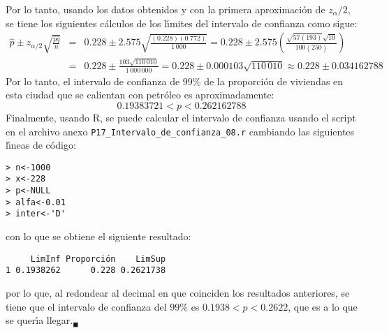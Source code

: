 \begin{solucion}
 Por lo tanto, usando los datos obtenidos y con la primera aproximaci\'on de $z_{\alpha}/2$, se tiene los siguientes c\'alculos de los l\'{\i}mites del intervalo de confianza como sigue:
 \begin{eqnarray*}
  \hat{p} \pm z_{\alpha/2} \sqrt{\frac{\hat{p}\hat{q}}{n}} & = & 0.228 \pm 2.575\sqrt{\frac{(0.228)(0.772)}{1\,000}} = 0.228 \pm 2.575\left( \frac{\sqrt{57(193)}\sqrt{10}}{100(250)} \right) \\
  & = & 0.228 \pm \frac{103\sqrt{110\,010}}{1\,000\,000} = 0.228 \pm 0.000103\sqrt{110\,010} \approx 0.228 \pm 0.034162788
 \end{eqnarray*}
 Por lo tanto, el intervalo de confianza de $99\%$ de la proporci\'on de viviendas en esta ciudad que se calientan con petr\'oleo es aproximadamente:
 \begin{equation*}
  0.19383721 < p < 0.262162788
 \end{equation*}
 Finalmente, usando R, se puede calcular el intervalo de confianza usando el script en el archivo anexo \texttt{P17\_Intervalo\_de\_confianza\_08.r} cambiando las siguientes l\'{\i}neas de c\'odigo:
 \begin{verbatim}
> n<-1000
> x<-228
> p<-NULL
> alfa<-0.01
> inter<-'D'
 \end{verbatim}
 \vspace{-0.5cm}
 con lo que se obtiene el siguiente resultado:
 \begin{verbatim}
     LimInf Proporción    LimSup
1 0.1938262      0.228 0.2621738
 \end{verbatim}
 \vspace{-0.5cm}
 por lo que, al redondear al decimal en que coinciden los resultados anteriores, se tiene que el intervalo de confianza del $99\%$ es $0.1938 <p< 0.2622$, que es a lo que se quer\'{\i}a llegar.${}_{\blacksquare}$
\end{solucion}

